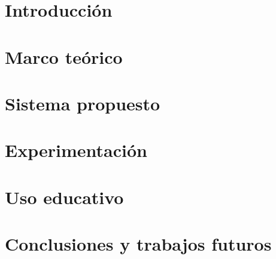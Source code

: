 \documentclass[11pt,a4paper,spanish]{book}
\begin{document}
\frontmatter








\tableofcontents
\listoffigures
\mainmatter

\chapter{Introducción}













\chapter{Marco teórico}

\label{marcoTeorico}







\chapter{Sistema propuesto}

\label{sistemaPropuesto}



\chapter{Experimentación}

\label{experimentacion}



\chapter{Uso educativo}



\chapter{Conclusiones y trabajos futuros}



\label{conclucionesYTrabajosFuturos}




\end{document}
